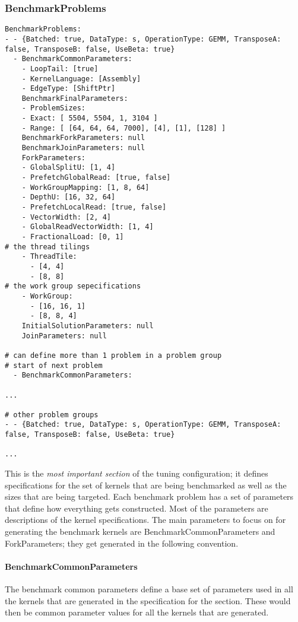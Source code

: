\documentclass[]{article}
\begin{document}
\subsubsection{BenchmarkProblems}
\begin{verbatim}
BenchmarkProblems:
- - {Batched: true, DataType: s, OperationType: GEMM, TransposeA: false, TransposeB: false, UseBeta: true}
  - BenchmarkCommonParameters:
    - LoopTail: [true]
    - KernelLanguage: [Assembly]
    - EdgeType: [ShiftPtr]
    BenchmarkFinalParameters:
    - ProblemSizes:
    - Exact: [ 5504, 5504, 1, 3104 ]
    - Range: [ [64, 64, 64, 7000], [4], [1], [128] ]
    BenchmarkForkParameters: null
    BenchmarkJoinParameters: null
    ForkParameters:
    - GlobalSplitU: [1, 4]
    - PrefetchGlobalRead: [true, false]
    - WorkGroupMapping: [1, 8, 64]
    - DepthU: [16, 32, 64]
    - PrefetchLocalRead: [true, false]
    - VectorWidth: [2, 4]
    - GlobalReadVectorWidth: [1, 4]
    - FractionalLoad: [0, 1]
# the thread tilings
    - ThreadTile:
      - [4, 4]
      - [8, 8]
# the work group sepecifications
    - WorkGroup:
      - [16, 16, 1]
      - [8, 8, 4]
    InitialSolutionParameters: null
    JoinParameters: null

# can define more than 1 problem in a problem group
# start of next problem
  - BenchmarkCommonParameters:

...

# other problem groups
- - {Batched: true, DataType: s, OperationType: GEMM, TransposeA: false, TransposeB: false, UseBeta: true}

...

\end{verbatim}

This is the \textit{most important section} of the tuning configuration; it defines specifications for the set of kernels that are being benchmarked as well as the sizes that are being targeted. Each benchmark problem has a set of parameters that define how everything gets constructed. Most of the parameters are descriptions of the kernel specifications. The main parameters to focus on for generating the benchmark kernels are BenchmarkCommonParameters and ForkParameters; they get generated in the following convention.

\paragraph{BenchmarkCommonParameters} The benchmark common parameters define a base set of parameters used in all the kernels that are generated in the specification for the section. These would then be common parameter values for all the kernels that are generated.
\end{document}
